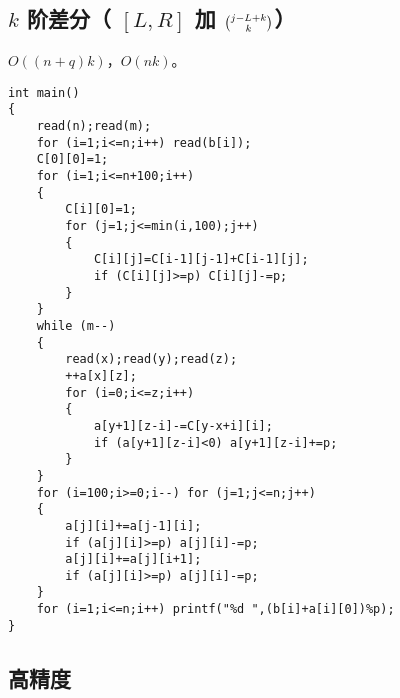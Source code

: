 \documentclass{ctexart}
\begin{document}
\subsection{$k$ 阶差分（ $[L,R]$ 加 $\tbinom{j-L+k}{k}$）}

$O((n+q)k)$，$O(nk)$。

\begin{lstlisting}
int main()
{
	read(n);read(m);
	for (i=1;i<=n;i++) read(b[i]);
	C[0][0]=1;
	for (i=1;i<=n+100;i++)
	{
		C[i][0]=1;
		for (j=1;j<=min(i,100);j++)
		{
			C[i][j]=C[i-1][j-1]+C[i-1][j];
			if (C[i][j]>=p) C[i][j]-=p;
		}
	}
	while (m--)
	{
		read(x);read(y);read(z);
		++a[x][z];
		for (i=0;i<=z;i++)
		{
			a[y+1][z-i]-=C[y-x+i][i];
			if (a[y+1][z-i]<0) a[y+1][z-i]+=p;
		}
	}
	for (i=100;i>=0;i--) for (j=1;j<=n;j++)
	{
		a[j][i]+=a[j-1][i];
		if (a[j][i]>=p) a[j][i]-=p;
		a[j][i]+=a[j][i+1];
		if (a[j][i]>=p) a[j][i]-=p;
	}
	for (i=1;i<=n;i++) printf("%d ",(b[i]+a[i][0])%p);
}
\end{lstlisting}

\subsection{高精度}
\end{document}
